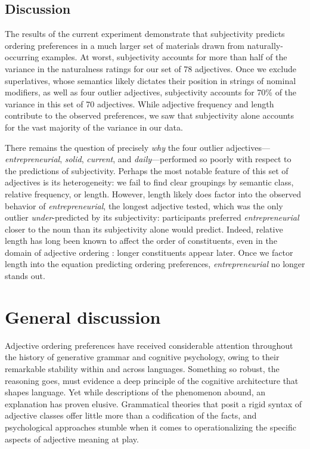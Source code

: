 \documentclass[12pt]{article}
\begin{document}
\subsection{Discussion}

The results of the current experiment demonstrate that subjectivity predicts ordering preferences %
in a much larger set of materials drawn from naturally-occurring examples. At worst, subjectivity accounts for more than half of the variance in the naturalness ratings for our set of 78 adjectives. Once we exclude superlatives, whose semantics likely dictates their position in strings of nominal modifiers, as well as four outlier adjectives, subjectivity accounts for 70\% of the variance in this set of 70 adjectives. While adjective frequency and length contribute to the observed preferences, we saw that subjectivity alone accounts for the vast majority of the variance in our data.

There remains the question of precisely \emph{why} the four outlier adjectives---​\emph{entrepreneurial}​, ​\emph{solid}​, ​\emph{current}​, and ​\emph{daily}---performed so poorly with respect to the predictions of subjectivity. Perhaps the most notable feature of this set of adjectives is its heterogeneity: we fail to find clear groupings by semantic class, relative frequency, or length. However, length likely does factor into the observed behavior of \emph{entrepreneurial}, the longest adjective tested, which was the only outlier \emph{under}-predicted by its subjectivity: participants preferred \emph{entrepreneurial} closer to the noun than its subjectivity alone would predict. Indeed, relative length has long been known to affect the order of constituents, even in the domain of adjective ordering \citep{wulff2003}: longer constituents appear later. Once we factor length into the equation predicting ordering preferences, \emph{entrepreneurial} no longer stands out.


\section{General discussion}

Adjective ordering preferences have received considerable attention throughout the history of generative grammar and cognitive psychology, owing to their remarkable stability within and across languages. Something so robust, the reasoning goes, must evidence a deep principle of the cognitive architecture that shapes language. Yet while descriptions of the phenomenon abound, an explanation has proven elusive. Grammatical theories that posit a rigid syntax of adjective classes offer little more than a codification of the facts, and psychological approaches stumble when it comes to operationalizing the specific aspects of adjective meaning at play. 
\end{document}
